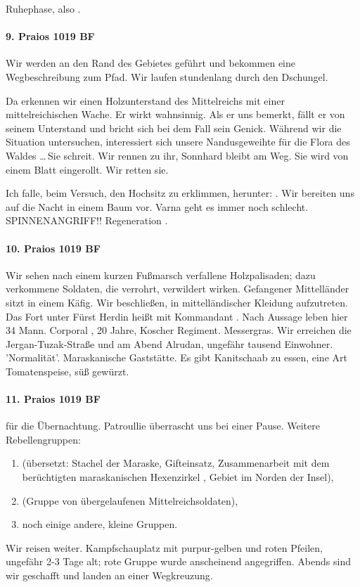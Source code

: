  Ruhephase, also . 
\paragraph{9. Praios 1019 BF}
\label{sec:9.-praios-1019}
Wir werden an den Rand des Gebietes geführt und bekommen eine Wegbeschreibung zum Pfad. Wir laufen stundenlang durch den Dschungel.


Da erkennen wir einen Holzunterstand des Mittelreichs mit einer mittelreichischen Wache. Er wirkt wahnsinnig. Als er uns bemerkt, fällt er von seinem Unterstand und bricht sich bei dem Fall sein Genick. 
 Während wir die Situation untersuchen, interessiert sich unsere Nandusgeweihte für die Flora des Waldes \dots \,Sie schreit. Wir rennen zu ihr, Sonnhard bleibt am Weg. Sie wird von einem Blatt eingerollt. Wir retten sie. 

Ich falle, beim Versuch, den Hochsitz zu erklimmen, herunter:
.
Wir bereiten uns auf die Nacht in einem Baum vor. Varna geht es immer noch schlecht. SPINNENANGRIFF!!
Regeneration
.

\paragraph{10. Praios 1019 BF}

Wir sehen nach einem kurzen Fußmarsch verfallene Holzpalisaden; dazu verkommene Soldaten, die verrohrt, verwildert wirken. Gefangener Mittelländer sitzt in einem Käfig.
Wir beschließen, in mittelländischer Kleidung aufzutreten. Das Fort unter Fürst Herdin heißt  mit Kommandant . Nach Aussage leben hier 34 Mann.
Corporal , 20 Jahre, Koscher Regiment.
 Messergras. Wir erreichen die Jergan-Tuzak-Straße und am Abend Alrudan, ungefähr tausend Einwohner. 'Normalität'. Maraskanische Gaststätte. Es gibt Kanitschaab zu essen, eine Art Tomatenspeise, süß gewürzt.

\paragraph{11. Praios 1019 BF}
 für die Übernachtung. Patroullie überrascht uns bei einer Pause.
Weitere Rebellengruppen:
\begin{enumerate}
\item {} (übersetzt: Stachel der Maraske, Gifteinsatz, Zusammenarbeit mit dem berüchtigten maraskanischen Hexenzirkel , Gebiet im Norden der Insel),
\item {} (Gruppe von übergelaufenen Mittelreichsoldaten),
\item noch einige andere, kleine Gruppen.
\end{enumerate}
Wir reisen weiter. Kampfschauplatz mit purpur-gelben und roten Pfeilen, ungefähr 2-3 Tage alt; rote Gruppe wurde anscheinend angegriffen. Abends sind wir geschafft und landen an einer Wegkreuzung.

